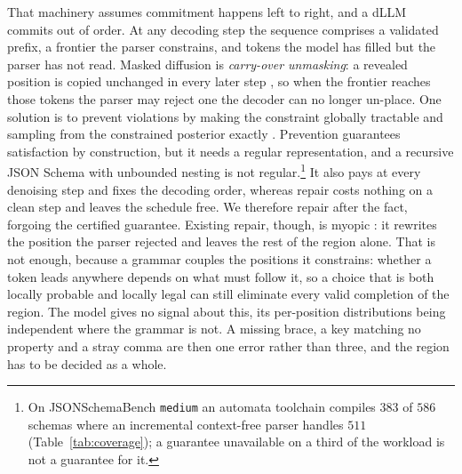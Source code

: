 \documentclass{article}
\begin{document}
That machinery assumes commitment happens left to right, and a dLLM commits out
of order. At any decoding step the sequence comprises a validated prefix, a
frontier the parser constrains, and tokens the model has filled but the parser
has not read. Masked diffusion is \emph{carry-over unmasking}: a revealed
position is copied unchanged in every later step
\citep{sahoo2024simple,shi2024simplified}, so when the frontier reaches those
tokens the parser may reject one the decoder can no longer un-place. One solution is to prevent violations by making the
constraint globally tractable and sampling from the constrained posterior
exactly \citep{suresh2025dingoconstrainedinferencediffusion}. Prevention
guarantees satisfaction by construction, but it needs a regular representation,
and a recursive JSON Schema with unbounded nesting is not
regular.\footnote{On JSONSchemaBench \texttt{medium} an automata toolchain
compiles $383$ of $586$ schemas where an incremental context-free parser handles
$511$ (Table~\ref{tab:coverage}); a guarantee unavailable on a third of the
workload is not a guarantee for it.} It also pays
at every denoising step and fixes the decoding order, whereas repair costs
nothing on a clean step and leaves the schedule free. We therefore repair after
the fact, forgoing the certified guarantee. Existing repair, though, is myopic
\citep{zhang2026lookaheadthenverifyreliableconstraineddecoding,cd4dllm}: it
rewrites the position the parser rejected and leaves the rest of the region
alone. That is not enough, because a grammar couples the positions it
constrains: whether a token leads anywhere depends on what must follow it, so a
choice that is both locally probable and locally legal can still eliminate every
valid completion of the region. The model gives no signal about this, its
per-position distributions being independent where the grammar is not. A missing
brace, a key matching no property and a stray comma are then one error rather
than three, and the region has to be decided as a whole.
\end{document}
